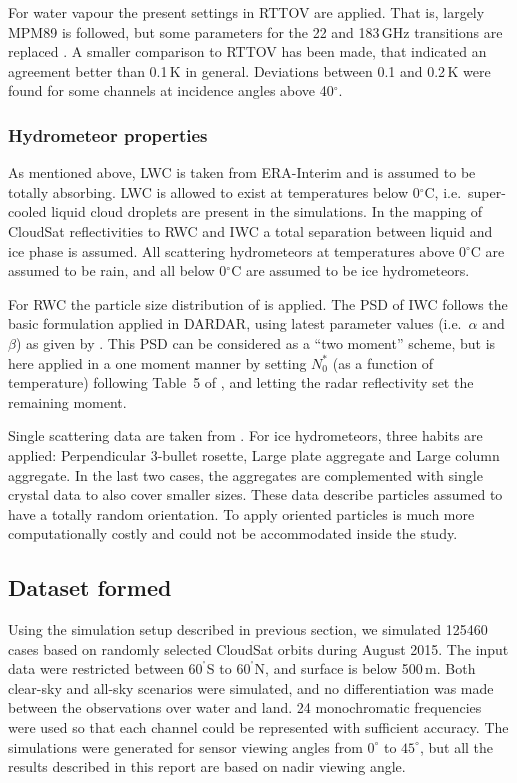 \documentclass[12pt]{article}
\newcommand{\degree}{\ensuremath{\mathrm{^\circ}}}
\begin{document}
For water vapour the present settings in RTTOV are applied. That is, largely
MPM89 \citep{liebe:89} is followed, but some parameters for the 22 and 183\,GHz
transitions are replaced \citep{saunders2018update,turner2019amsutran}. A
smaller comparison to RTTOV has been made, that indicated an agreement better
than 0.1\,K in general. Deviations between 0.1 and 0.2\,K were found for some
channels at incidence angles above 40$^\circ$.


\subsubsection{Hydrometeor properties}
%
As mentioned above, LWC is taken from ERA-Interim and is assumed to be totally
absorbing. LWC is allowed to exist at temperatures below 0$^\circ$C, i.e.\
super-cooled liquid cloud droplets are present in the simulations. In the
mapping of CloudSat reflectivities to RWC and IWC a total separation between
liquid and ice phase is assumed. All scattering hydrometeors at temperatures
above 0$^\circ$C are assumed to be rain, and all below 0$^\circ$C are assumed
to be ice hydrometeors.

For RWC the particle size distribution of \citet{abel2012improved} is applied.
The PSD of IWC follows the basic formulation applied in DARDAR, using latest
parameter values (i.e.\ $\alpha$ and $\beta$) as given by
\citet{amt-12-2819-2019}. This PSD can be considered as a ``two moment''
scheme, but is here applied in a one moment manner by setting $N_0^*$ (as a
function of temperature) following Table~5 of \citet{delanoe2014normalized},
and letting the radar reflectivity set the remaining moment.

Single scattering data are taken from \citet{eriksson:agene:18}. For ice
hydrometeors, three habits are applied: Perpendicular 3-bullet rosette, Large
plate aggregate and Large column aggregate. In the last two cases, the
aggregates are complemented with single crystal data to also cover smaller
sizes. These data describe particles assumed to have a totally random
orientation. To apply oriented particles is much more computationally costly
and could not be accommodated inside the study.


\subsection{Dataset formed}
%
Using the simulation setup described in previous section, we simulated 125460 cases based on randomly selected CloudSat orbits during August 2015. The input data
were restricted between $60^{\degree}$S to $60^{\degree}$N, and surface is below 500\,m. Both clear-sky and all-sky scenarios were simulated, and no differentiation was made between the observations over water and land. 24 monochromatic frequencies were used so that each channel could be represented with sufficient accuracy. The simulations were generated for sensor viewing angles from $0^\circ$ to $45^\circ$, but all the results described in this report are based on nadir viewing angle.
\end{document}
